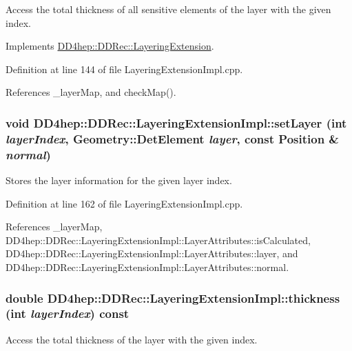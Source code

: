 Access the total thickness of all sensitive elements of the layer with the given index. 

Implements \hyperlink{class_d_d4hep_1_1_d_d_rec_1_1_layering_extension_a06a960f9de84690eb3383f89d1aada13}{DD4hep::DDRec::LayeringExtension}.

Definition at line 144 of file LayeringExtensionImpl.cpp.

References \_\-layerMap, and checkMap().\hypertarget{class_d_d4hep_1_1_d_d_rec_1_1_layering_extension_impl_a75921469ae3156903c1468cda59ce4cf}{
\subsubsection[{setLayer}]{\setlength{\rightskip}{0pt plus 5cm}void DD4hep::DDRec::LayeringExtensionImpl::setLayer (int {\em layerIndex}, \/  {\bf Geometry::DetElement} {\em layer}, \/  const {\bf Position} \& {\em normal})}}
\label{class_d_d4hep_1_1_d_d_rec_1_1_layering_extension_impl_a75921469ae3156903c1468cda59ce4cf}


Stores the layer information for the given layer index. 

Definition at line 162 of file LayeringExtensionImpl.cpp.

References \_\-layerMap, DD4hep::DDRec::LayeringExtensionImpl::LayerAttributes::isCalculated, DD4hep::DDRec::LayeringExtensionImpl::LayerAttributes::layer, and DD4hep::DDRec::LayeringExtensionImpl::LayerAttributes::normal.\hypertarget{class_d_d4hep_1_1_d_d_rec_1_1_layering_extension_impl_a42af8e16d3f3474d29f2ee3af06ce7e7}{
\subsubsection[{thickness}]{\setlength{\rightskip}{0pt plus 5cm}double DD4hep::DDRec::LayeringExtensionImpl::thickness (int {\em layerIndex}) const}}
\label{class_d_d4hep_1_1_d_d_rec_1_1_layering_extension_impl_a42af8e16d3f3474d29f2ee3af06ce7e7}


Access the total thickness of the layer with the given index. 

